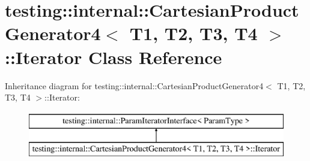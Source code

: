 \hypertarget{classtesting_1_1internal_1_1_cartesian_product_generator4_1_1_iterator}{}\section{testing\+:\+:internal\+:\+:Cartesian\+Product\+Generator4$<$ T1, T2, T3, T4 $>$\+:\+:Iterator Class Reference}
\label{classtesting_1_1internal_1_1_cartesian_product_generator4_1_1_iterator}
Inheritance diagram for testing\+:\+:internal\+:\+:Cartesian\+Product\+Generator4$<$ T1, T2, T3, T4 $>$\+:\+:Iterator\+:\begin{figure}[H]
\begin{center}
\leavevmode
\includegraphics[height=2.000000cm]{classtesting_1_1internal_1_1_cartesian_product_generator4_1_1_iterator}
\end{center}
\end{figure}
